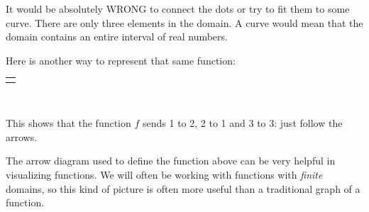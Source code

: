\documentclass[10pt,]{book}
\theoremstyle{plain}
\theoremstyle{definition}
\theoremstyle{definition}
\theoremstyle{definition}
\numberwithin{equation}{chapter}
\newlength{\panelmax}
\begin{document}
\par
\hypertarget{p-2092}{}%
It would be absolutely WRONG to connect the dots or try to fit them to some curve. There are only three elements in the domain. A curve would mean that the domain contains an entire interval of real numbers.%
\par
\hypertarget{p-2093}{}%
Here is another way to represent that same function:%
{%
\setlength{\panelmax}{0pt}
\ifdefined\panelboxAimage\else\newsavebox{\panelboxAimage}\fi%
\begin{lrbox}{\panelboxAimage}
\end{lrbox}
\ifdefined\phAimage\else\newlength{\phAimage}\fi%
\setlength{\phAimage}{\ht\panelboxAimage+\dp\panelboxAimage}
\settototalheight{\phAimage}{\usebox{\panelboxAimage}}
\setlength{\panelmax}{\maxof{\panelmax}{\phAimage}}
\leavevmode%
\setlength{\tabcolsep}{0\linewidth}
\par\medskip\noindent
\hspace*{0.415\linewidth}%
\begin{tabular}{@{}*{1}{c}@{}}
\begin{minipage}[c][\panelmax][t]{0.17\linewidth}\usebox{\panelboxAimage}\end{minipage}\end{tabular}\\
}%
\par
\hypertarget{p-2094}{}%
This shows that the function \(f\) sends 1 to 2, 2 to 1 and 3 to 3: just follow the arrows.%
\par
\hypertarget{p-2095}{}%
The arrow diagram used to define the function above can be very helpful in visualizing functions. We will often be working with functions with \emph{finite} domains, so this kind of picture is often more useful than a traditional graph of a function.%
\par
\hypertarget{p-2096}{}%
\end{document}
